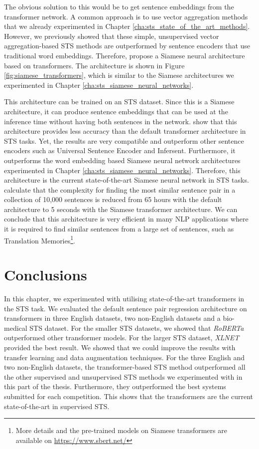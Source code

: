 The obvious solution to this would be to get sentence embeddings from the transformer network. A common approach is to use vector aggregation methods that we already experimented in Chapter \ref{cha:sts_state_of_the_art_methods}. However, we previously showed that these simple, unsupervised vector aggregation-based STS methods are outperformed by sentence encoders that use traditional word embeddings. Therefore, \textcite{reimers-gurevych-2019-sentence} propose a Siamese neural architecture based on transformers. The architecture is shown in Figure \ref{fig:siamese_transformers}, which is similar to the Siamese architectures we experimented in Chapter \ref{cha:sts_siamese_neural_networks}.

This architecture can be trained on an STS dataset. Since this is a Siamese architecture, it can produce sentence embeddings that can be used at the inference time without having both sentences in the network. \textcite{reimers-gurevych-2019-sentence} show that this architecture provides less accuracy than the default transformer architecture in STS tasks. Yet, the results are very compatible and outperform other sentence encoders such as Universal Sentence Encoder and Infersent. Furthermore, it outperforms the word embedding based Siamese neural network architectures experimented in Chapter \ref{cha:sts_siamese_neural_networks}. Therefore, this architecture is the current state-of-the-art Siamese neural network in STS tasks. \textcite{reimers-gurevych-2019-sentence} calculate that the complexity for finding the most similar sentence pair in a collection of 10,000 sentences is reduced from 65 hours with the default architecture to 5 seconds with the Siamese transformer architecture. We can conclude that this architecture is very efficient in many NLP applications where it is required to find similar sentences from a large set of sentences, such as Translation Memories\footnote{More details and the pre-trained models on Siamese transformers are available on \url{https://www.sbert.net/}}.  


\section{Conclusions}
In this chapter, we experimented with utilising state-of-the-art transformers in the STS task. We evaluated the default sentence pair regression architecture on transformers in three English datasets, two non-English datasets and a bio-medical STS dataset. For the smaller STS datasets, we showed that \textit{RoBERTa} outperformed other transformer models. For the larger STS dataset, \textit{XLNET} provided the best result. We showed that we could improve the results with transfer learning and data augmentation techniques. For the three English and two non-English datasets, the transformer-based STS method outperformed all the other supervised and unsupervised STS methods we experimented with in this part of the thesis. Furthermore, they outperformed the best systems submitted for each competition. This shows that the transformers are the current state-of-the-art in supervised STS.

